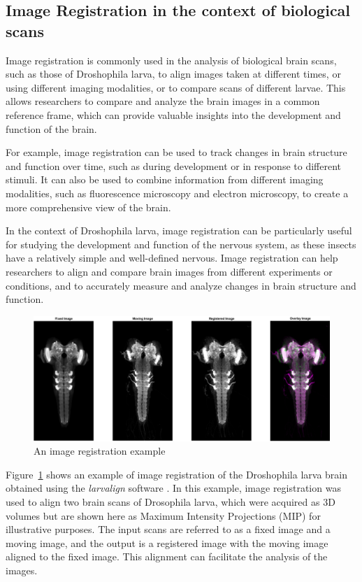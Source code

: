 \documentclass{book}
\begin{document}
	\subsection{Image Registration in the context of biological scans}
	Image registration is commonly used in the analysis of biological brain scans, such as those of Droshophila larva, to align images taken at different times, or using different imaging modalities, or to compare scans of different larvae. This allows researchers to compare and analyze the brain images in a common reference frame, which can provide valuable insights into the development and function of the brain.
	
	For example, image registration can be used to track changes in brain structure and function over time, such as during development or in response to different stimuli. It can also be used to combine information from different imaging modalities, such as fluorescence microscopy and electron microscopy, to create a more comprehensive view of the brain.
	
	In the context of Droshophila larva, image registration can be particularly useful for studying the development and function of the nervous system, as these insects have a relatively simple and well-defined nervous. Image registration can help researchers to align and compare brain images from different experiments or conditions, and to accurately measure and analyze changes in brain structure and function.
	
	\begin{figure}[h!]
		\centering
		\includegraphics[width=\linewidth]{resources/chapter1/figure1.png}
		\caption{An image registration example}
		\label{fig:Registration}
	\end{figure}
	
	Figure~\ref{fig:Registration} shows an example of image registration of the Droshophila larva brain obtained using the \textit{larvalign} software \cite{larvalign}. In this example, image registration was used to align two brain scans of Drosophila larva, which were acquired as 3D volumes but are shown here as Maximum Intensity Projections (MIP) for illustrative purposes. The input scans are referred to as a fixed image and a moving image, and the output is a registered image with the moving image aligned to the fixed image. This alignment can facilitate the analysis of the images.
	
\end{document}
